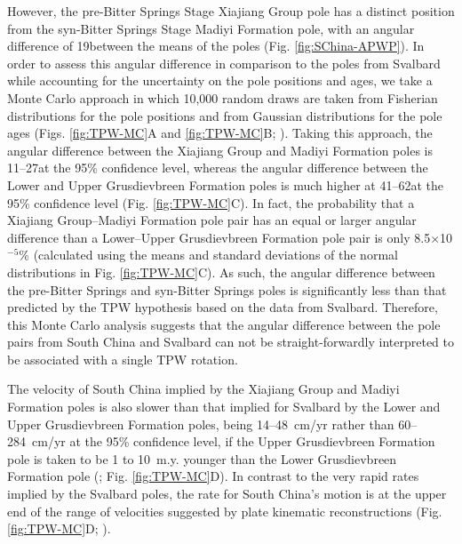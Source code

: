 However, the pre-Bitter Springs Stage Xiajiang Group pole has a distinct position from the syn-Bitter Springs Stage Madiyi Formation pole, with an angular difference of 19\degrees between the means of the poles (Fig. \ref{fig:SChina-APWP}). In order to assess this angular difference in comparison to the poles from Svalbard while accounting for the uncertainty on the pole positions and ages, we take a Monte Carlo approach in which 10,000 random draws are taken from Fisherian distributions for the pole positions and from Gaussian distributions for the pole ages (Figs. \ref{fig:TPW-MC}A and \ref{fig:TPW-MC}B; \citealp{Swanson-Hysell2014b}). Taking this approach, the angular difference between the Xiajiang Group and Madiyi Formation poles is 11--27\degrees at the 95\% confidence level, whereas the angular difference between the Lower and Upper Grusdievbreen Formation poles is much higher at 41--62\degrees at the 95\% confidence level (Fig. \ref{fig:TPW-MC}C). In fact, the probability that a Xiajiang Group--Madiyi Formation pole pair has an equal or larger angular difference than a Lower--Upper Grusdievbreen Formation pole pair is only 8.5$\times$10$^{-5}$\% (calculated using the means and standard deviations of the normal distributions in Fig. \ref{fig:TPW-MC}C). As such, the angular difference between the pre-Bitter Springs and syn-Bitter Springs poles is significantly less than that predicted by the TPW hypothesis based on the data from Svalbard. Therefore, this Monte Carlo analysis suggests that the angular difference between the pole pairs from South China and Svalbard can not be straight-forwardly interpreted to be associated with a single TPW rotation.

The velocity of South China implied by the Xiajiang Group and Madiyi Formation poles is also slower than that implied for Svalbard by the Lower and Upper Grusdievbreen Formation poles, being 14--48~cm/yr rather than 60--284~cm/yr at the 95\% confidence level, if the Upper Grusdievbreen Formation pole is taken to be 1 to 10~m.y. younger than the Lower Grusdievbreen Formation pole (\citealp{Maloof2006a}; Fig. \ref{fig:TPW-MC}D). In contrast to the very rapid rates implied by the Svalbard poles, the rate for South China's motion is at the upper end of the range of velocities suggested by plate kinematic reconstructions (Fig. \ref{fig:TPW-MC}D; \citealp{Meert1993a, Zahirovic2015a}).


